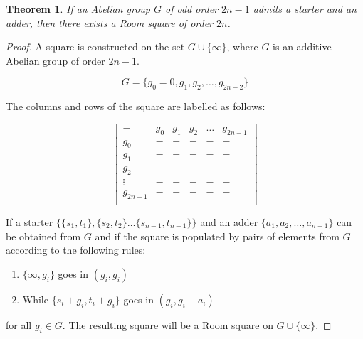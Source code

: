 \documentclass[
  11pt,
  a4paper]{book}\usepackage[]{graphicx}\usepackage[]{xcolor}
\newtheorem{theorem}{Theorem}
\begin{document}
\begin{theorem}
\label{thm:starter-adder}
If an Abelian group $G$ of odd order $2n - 1$ admits a starter
and an adder, then there exists a Room square of order $2n$.
\end{theorem}

\begin{proof}
A square is constructed on the set $G \cup \{\infty\}$, where $G$ is an
additive Abelian group of order $2n-1$.

\begin{equation}
G = \{g_0 = 0, g_1, g_2, \ldots, g_{2n-2}\}
\end{equation}

The columns and rows of the square are labelled as follows:

\begin{equation}
  \begin{bmatrix}
        -      & g_0  &  g_1  &  g_2  & \ldots &  g_{2n - 1} \\
       g_0     &   -  &   -   &   -   &    -   &     -       \\
       g_1     &   -  &   -   &   -   &    -   &     -       \\
       g_2     &   -  &   -   &   -   &    -   &     -       \\
     \vdots    &   -  &   -   &   -   &    -   &     -       \\
    g_{2n - 1} &   -  &   -   &   -   &    -   &     -       \\
  \end{bmatrix}
\end{equation}

If a starter
$\{\{s_1, t_1\}, \{s_2, t_2\} \ldots \{s_{n - 1}, t_{n - 1}\}\}$
and an
adder $\{a_1, a_2, \ldots, a_{n - 1}\}$ can be obtained from
$G$ and if the square is populated by pairs of elements from
$G$ according to the following rules:

\begin{enumerate}
  \item{$\{\infty, g_i\}$ goes in $(g_i, g_i)$}
  \item{While $\{s_i + g_i, t_i + g_i\}$ goes in $(g_i, g_i - a_i)$}
\end{enumerate}

for all $g_i \in G$. The resulting square will be a Room square on
$G \cup \{\infty\}$.


\end{proof}
\end{document}
